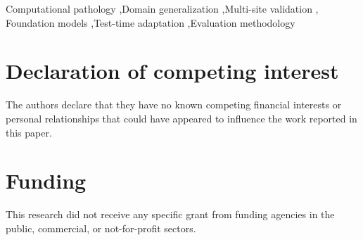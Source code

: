 \documentclass[a4paper,fleqn]{cas-sc}
\begin{document}
\begin{keywords}
Computational pathology \sep Domain generalization \sep Multi-site validation \sep
Foundation models \sep Test-time adaptation \sep Evaluation methodology
\end{keywords}

\maketitle










\printcredits

\section*{Declaration of competing interest}
The authors declare that they have no known competing financial interests or
personal relationships that could have appeared to influence the work reported
in this paper.

\section*{Funding}
This research did not receive any specific grant from funding agencies in the
public, commercial, or not-for-profit sectors.
\end{document}

